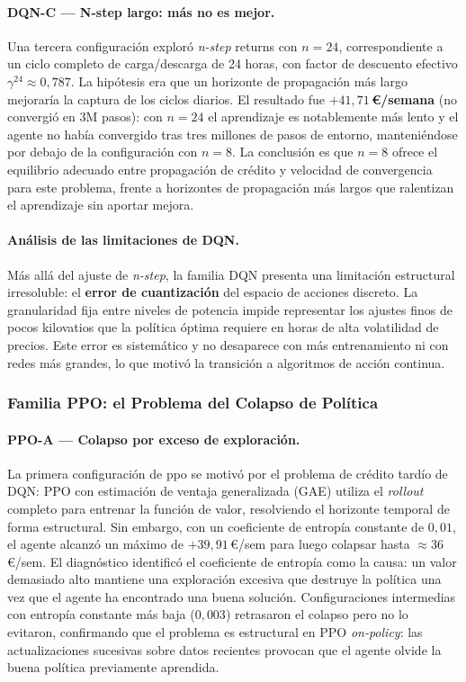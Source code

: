 \documentclass[12pt, a4paper, twoside]{report}
\begin{document}
\paragraph{DQN-C — N-step largo: más no es mejor.}
Una tercera configuración exploró \textit{n-step} returns con $n=24$,
correspondiente a un ciclo completo de carga/descarga de 24 horas, con factor
de descuento efectivo $\gamma^{24} \approx 0{,}787$. La hipótesis era que un
horizonte de propagación más largo mejoraría la captura de los ciclos diarios.
El resultado fue \textbf{$+41{,}71$\,€/semana} (no convergió en 3M pasos): con
$n=24$ el aprendizaje es notablemente más lento y el agente no había convergido
tras tres millones de pasos de entorno, manteniéndose por debajo de la
configuración con $n=8$. La conclusión es que $n=8$ ofrece el equilibrio
adecuado entre propagación de crédito y velocidad de convergencia para este
problema, frente a horizontes de propagación más largos que ralentizan el
aprendizaje sin aportar mejora.

\paragraph{Análisis de las limitaciones de DQN.}
Más allá del ajuste de \textit{n-step}, la familia DQN presenta una limitación
estructural irresoluble: el \textbf{error de cuantización} del espacio de
acciones discreto. La granularidad fija entre niveles de potencia impide
representar los ajustes finos de pocos kilovatios que la política óptima
requiere en horas de alta volatilidad de precios. Este error es sistemático
y no desaparece con más entrenamiento ni con redes más grandes, lo que motivó
la transición a algoritmos de acción continua.

\subsubsection{Familia PPO: el Problema del Colapso de Política}

\paragraph{PPO-A — Colapso por exceso de exploración.}
La primera configuración de \acrshort{ppo} se motivó por el problema de crédito
tardío de DQN: PPO con estimación de ventaja generalizada (GAE) utiliza el
\textit{rollout} completo para entrenar la función de valor, resolviendo el
horizonte temporal de forma estructural. Sin embargo, con un coeficiente de
entropía constante de $0{,}01$, el agente alcanzó un máximo de $+39{,}91$\,€/sem
para luego colapsar hasta $\approx$36\,€/sem. El diagnóstico identificó el
coeficiente de entropía como la causa: un valor demasiado alto mantiene una
exploración excesiva que destruye la política una vez que el agente ha
encontrado una buena solución. Configuraciones intermedias con entropía
constante más baja ($0{,}003$) retrasaron el colapso pero no lo evitaron,
confirmando que el problema es estructural en PPO \textit{on-policy}: las
actualizaciones sucesivas sobre datos recientes provocan que el agente olvide
la buena política previamente aprendida.
\end{document}
